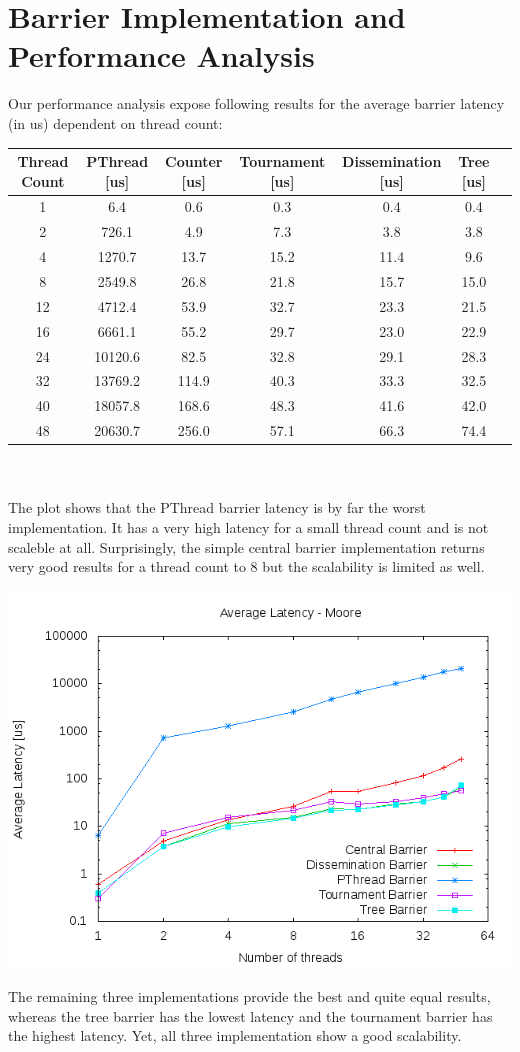 \documentclass{article}
\newcommand{\enterProblemHeader}[1]{
}
\newcommand{\exitProblemHeader}[1]{
}
\newcounter{homeworkProblemCounter} %
\newcommand{\homeworkProblemName}{}
\newenvironment{homeworkProblem}[1][Problem \arabic{homeworkProblemCounter}]{ %
\stepcounter{homeworkProblemCounter} %
\renewcommand{\homeworkProblemName}{#1} %
\section{\homeworkProblemName} %
}{
}
\begin{document}
\begin{homeworkProblem}[Barrier Implementation and Performance Analysis]
Our performance analysis expose following results for the average barrier latency (in us)
dependent on thread count:
\\
\begin{tabular}{|c|c|c|c|c|c|c|}\hline
   Thread Count & PThread [us] & Counter [us] & Tournament [us] & Dissemination [us] & Tree [us] \\ \hline
   1 & 6.4 & 0.6 & 0.3 & 0.4 & 0.4 \\ \hline
   2 & 726.1 & 4.9 & 7.3 & 3.8 & 3.8  \\ \hline
   4 & 1270.7 & 13.7 & 15.2 & 11.4 & 9.6   \\ \hline
   8 & 2549.8 & 26.8 & 21.8 & 15.7 & 15.0  \\ \hline
   12 & 4712.4 & 53.9 & 32.7 & 23.3 & 21.5  \\ \hline
   16 & 6661.1 & 55.2 & 29.7 & 23.0 & 22.9 \\ \hline
   24 & 10120.6 & 82.5 & 32.8 & 29.1 & 28.3   \\ \hline
   32 & 13769.2 & 114.9 & 40.3 & 33.3 & 32.5 \\ \hline
   40 & 18057.8 & 168.6 & 48.3 & 41.6 & 42.0   \\ \hline
   48 & 20630.7 & 256.0 & 57.1 & 66.3 & 74.4 \\ \hline
\end{tabular}
\\\\
The plot shows that the PThread barrier latency is by far the worst implementation. It 
has a very high latency for a small thread count and is not scaleble at all. Surprisingly,
the simple central barrier implementation returns very good results for a thread count 
to 8 but the scalability is limited as well.
\begin{center}
\includegraphics[width=0.8\columnwidth]{ave_latency.png}
\end{center}
The remaining three implementations provide the best and quite equal results, whereas the 
tree barrier has the lowest latency and the tournament barrier has the highest latency.
Yet, all three implementation show a good scalability.
\end{homeworkProblem}

\clearpage
\end{document}
